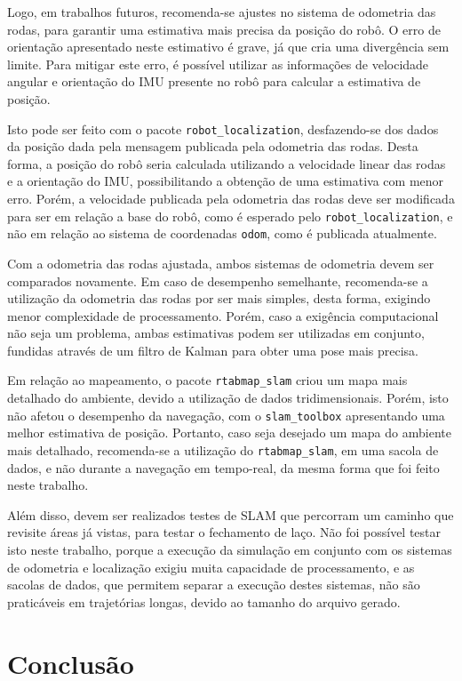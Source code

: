 \documentclass[repeatfields,xlists,xpacks,oneside,yearsonly]{ufrgscca}
\begin{document}
Logo, em trabalhos futuros, recomenda-se ajustes no sistema de
odometria das rodas, para garantir uma estimativa mais precisa da
posição do robô. O erro de orientação apresentado neste estimativo é
grave, já que cria uma divergência sem limite. Para mitigar este
erro, é possível utilizar as informações de velocidade angular e
orientação do IMU presente no robô para calcular a estimativa de
posição.

Isto pode ser feito com o pacote \texttt{robot\_localization},
desfazendo-se dos dados da posição dada pela mensagem publicada pela
odometria das rodas. Desta forma, a posição do robô seria calculada
utilizando a velocidade linear das rodas e a orientação do IMU,
possibilitando a obtenção de uma estimativa com menor erro. Porém, a
velocidade publicada pela odometria das rodas deve ser modificada
para ser em relação a base do robô, como é esperado pelo
\texttt{robot\_localization}, e não em relação ao sistema de
coordenadas \texttt{odom}, como é publicada atualmente.

Com a odometria das rodas ajustada, ambos sistemas de odometria devem
ser comparados novamente. Em caso de desempenho semelhante,
recomenda-se a utilização da odometria das rodas por ser mais
simples, desta forma, exigindo menor complexidade de processamento.
Porém, caso a exigência computacional não seja um problema, ambas
estimativas podem ser utilizadas em conjunto, fundidas através de um
filtro de Kalman para obter uma pose mais precisa.

Em relação ao mapeamento, o pacote \texttt{rtabmap\_slam} criou um
mapa mais detalhado do ambiente, devido a utilização de dados
tridimensionais. Porém, isto não afetou o desempenho da navegação,
com o \texttt{slam\_toolbox} apresentando uma melhor estimativa de
posição. Portanto, caso seja desejado um mapa do ambiente mais
detalhado, recomenda-se a utilização do \texttt{rtabmap\_slam}, em
uma sacola de dados, e não durante a navegação em tempo-real, da
mesma forma que foi feito neste trabalho.

Além disso, devem ser realizados testes de SLAM que percorram um
caminho que revisite áreas já vistas, para testar o fechamento de
laço. Não foi possível testar isto neste trabalho, porque a execução
da simulação em conjunto com os sistemas de odometria e localização
exigiu muita capacidade de processamento, e as sacolas de dados, que
permitem separar a execução destes sistemas, não são praticáveis em
trajetórias longas, devido ao tamanho do arquivo gerado.

\chapter{Conclusão}
\label{conclusao}
\end{document}
